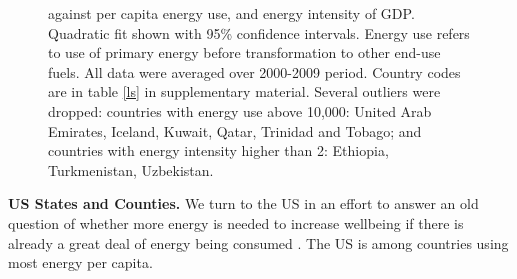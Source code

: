 \documentclass[10pt, letterpaper]{article}
\begin{document}
\begin{spacing}{1.4}
\begin{figure}[H]
{   against per capita energy use, and energy intensity of GDP. Quadratic fit shown with 95\%
   confidence intervals. Energy use
   refers to use of primary energy before transformation to other end-use
   fuels. All data were averaged over 2000-2009 period.  %
 Country codes are in table \ref{ls} in supplementary material. 
 Several outliers were dropped: countries with energy use above 10,000: United Arab Emirates, Iceland, Kuwait, Qatar, Trinidad and Tobago; and countries with energy intensity higher than 2: Ethiopia, Turkmenistan, Uzbekistan.}\label{couWvsLsEnePerGdp2} 
\end{figure}


\textbf{US States and Counties.} We turn to the US in an effort to answer
an old question of whether more energy is needed to increase wellbeing if there
is already a great deal of energy being consumed \cite{mazur74}. The US is among
countries using most energy per capita.
%


\end{spacing}
\end{document}
